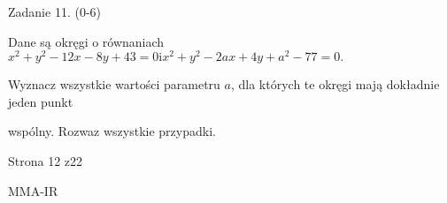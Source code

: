 \documentclass[a4paper,12pt]{article}
\begin{document}
Zadanie 11. (0-6)

Dane są okręgi o równaniach $x^{2}+y^{2}-12x-8y+43=0 \mathrm{i} x^{2}+y^{2}-2ax+4y+a^{2}-77=0.$

Wyznacz wszystkie wartości parametru $a$, dla których te okręgi mają dokładnie jeden punkt

wspólny. Rozwaz wszystkie przypadki.

Strona 12 z22

MMA-IR
\end{document}
